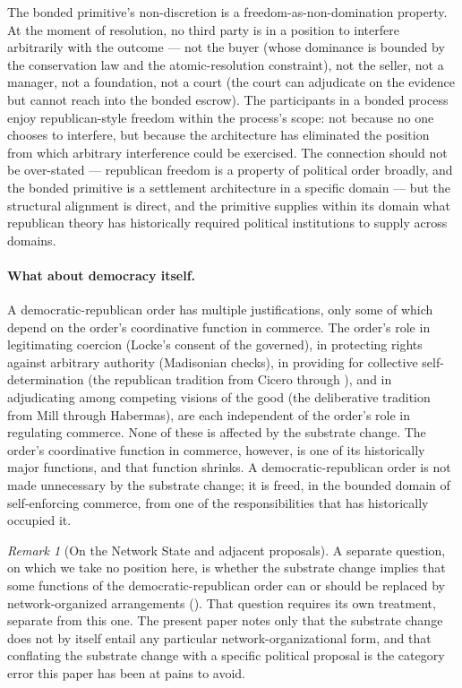 \documentclass[11pt,a4paper]{article}
\theoremstyle{remark}
\newtheorem{remark}{Remark}[section]
\begin{document}
The bonded primitive's non-discretion is a freedom-as-non-domination
property. At the moment of resolution, no third party is in a
position to interfere arbitrarily with the outcome --- not the
buyer (whose dominance is bounded by the conservation law and the
atomic-resolution constraint), not the seller, not a manager, not
a foundation, not a court (the court can adjudicate on the
evidence but cannot reach into the bonded escrow). The
participants in a bonded process enjoy republican-style freedom
within the process's scope: not because no one chooses to
interfere, but because the architecture has eliminated the
position from which arbitrary interference could be exercised.
The connection should not be over-stated --- republican freedom
is a property of political order broadly, and the bonded
primitive is a settlement architecture in a specific domain ---
but the structural alignment is direct, and the primitive supplies
within its domain what republican theory has historically required
political institutions to supply across domains.

\paragraph{What about democracy itself.}
A democratic-republican order has multiple justifications, only
some of which depend on the order's coordinative function in
commerce. The order's role in legitimating coercion (Locke's
consent of the governed), in protecting rights against arbitrary
authority (Madisonian checks), in providing for collective
self-determination (the republican tradition from Cicero through
\citet{pettit1997republicanism, pettit2012on}), and in adjudicating
among competing visions of the good
(the deliberative tradition from Mill through Habermas), are
each independent of the order's role in regulating commerce.
None of these is affected by the substrate change. The order's
coordinative function in commerce, however, is one of its
historically major functions, and that function shrinks. A
democratic-republican order is not made unnecessary by the
substrate change; it is freed, in the bounded domain of
self-enforcing commerce, from one of the responsibilities that
has historically occupied it.

\begin{remark}[On the Network State and adjacent proposals]
A separate question, on which we take no position here, is
whether the substrate change implies that some functions of the
democratic-republican order can or should be replaced by
network-organized arrangements (\citealt{srinivasan2022network}).
That question requires its own treatment, separate from this
one. The present paper notes only
that the substrate change does not by itself entail any
particular network-organizational form, and that conflating the
substrate change with a specific political proposal is the
category error this paper has been at pains to avoid.
\end{remark}
\end{document}
